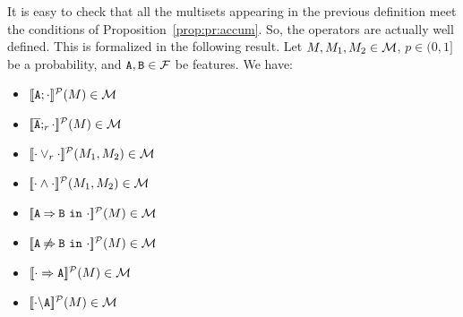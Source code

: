 It is easy to check that all the multisets appearing in the previous
definition meet the conditions of Proposition~\ref{prop:pr:accum}. So,
the operators are actually well defined. This is formalized in the
following result.
\bprop\label{prp:domain:prob}
  Let  $M,M_{1}, M_{2}\in{\cal M}$,
  $p\in(0,1]$ be a probability, and
  $\mathtt{A},\mathtt{B}\in{\cal F}$ be features. We have:
\begin{multicols}{2}
	\begin{itemize}
		\item $[\![\mathtt{A};\cdot]\!]^{\cal P}(M)\in{\cal M}$
		\item $[\![\overline{\mathtt{A}};_{r}\cdot]\!]^{\cal P}(M)\in{\cal M}$
		\item $[\![\cdot\mathbin{\lor}_{r}\cdot]\!]^{\cal P}(M_{1},M_{2})\in{\cal M}$
		\item $[\![\cdot\mathbin{\wedge}\cdot]\!]^{\cal P}(M_{1},M_{2})\in{\cal M}$
		\item $[\![\mathtt{A}\mathbin{\Rightarrow}\mathtt{B}\ \mathtt{in}\ \cdot]\!]^{\cal P}(M)\in{\cal M}$
		\item $[\![\mathtt{A}\mathbin{\not\Rightarrow}\mathtt{B}\ \mathtt{in}\ \cdot]\!]^{\cal P}(M)\in{\cal M}$
		\item $[\![\cdot\Rightarrow\mathtt{A}]\!]^{\cal P}(M)\in{\cal M}$
		\item $[\![\cdot\backslash\mathtt{A}]\!]^{\cal P}(M)\in{\cal M}$
	\end{itemize}
\end{multicols}
\eprop





